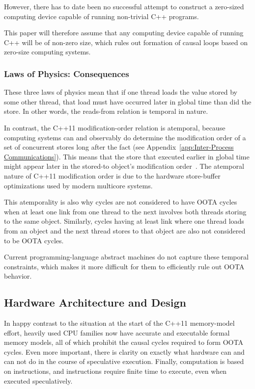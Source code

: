 \documentclass[10]{article}
\begin{document}
However, there has to date been no successful attempt to construct a
zero-sized computing device capable of running non-trivial C++ programs.

This paper will therefore assume that any computing device capable of
running C++ will be of non-zero size, which rules out formation of
causal loops based on zero-size computing systems.

\subsubsection{Laws of Physics: Consequences}
\label{sec:Laws of Physics: Consequences}

These three laws of physics mean that if one thread loads the value
stored by some other thread, that load must have occurred later
in global time than did the store.
In other words, the reads-from relation is temporal in nature.

In contrast, the C++11 modification-order relation is atemporal,
because computing systems can and observably do determine the
modification order of a set of concurrent stores long after the fact
(see Appendix~\ref{app:Inter-Process Communications}).
This means that the store that executed earlier in global time
might appear later in the stored-to object's modification
order~\cite{McKenney20xxParallelProgramming}.
The atemporal nature of C++11 modification order is due to the hardware
store-buffer optimizations used by modern multicore systems.

This atemporality is also why cycles are not considered to have
OOTA cycles when at least one link from one thread to the next
involves both threads storing to the same object.
Similarly, cycles having at least link where one thread loads from an
object and the next thread stores to that object are also not considered
to be OOTA cycles.

Current programming-language abstract machines do not capture these
temporal constraints, which makes it more difficult for them to
efficiently rule out OOTA behavior.

\subsection{Hardware Architecture and Design}
\label{sec:Hardware Architecture and Design}

In happy contrast to the situation at the start of the C++11 memory-model
effort, heavily used CPU families now have accurate and executable formal
memory models, all of which prohibit the causal cycles required to form
OOTA cycles.
Even more important, there is clarity on exactly what hardware can and
can not do in the course of speculative execution.
Finally, computation is based on instructions, and instructions require
finite time to execute, even when executed speculatively.
\end{document}
